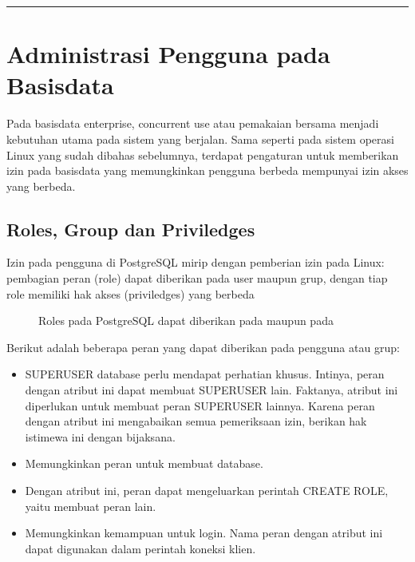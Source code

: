 \documentclass[letterpaper,10pt,english]{sphinxmanual}
\let\sphinxpxdimen\pdfpxdimen\else\newdimen\sphinxpxdimen
\begin{document}
\bigskip\hrule\bigskip



\section{Administrasi Pengguna pada Basisdata}
\label{\detokenize{sesi2/dbmanagement:administrasi-pengguna-pada-basisdata}}\label{\detokenize{sesi2/dbmanagement::doc}}
Pada basisdata enterprise, concurrent use atau pemakaian bersama menjadi kebutuhan utama pada sistem yang berjalan. Sama seperti pada sistem operasi Linux yang sudah dibahas sebelumnya, terdapat pengaturan untuk memberikan izin pada basisdata yang memungkinkan pengguna berbeda mempunyai izin akses yang berbeda.


\subsection{Roles, Group dan Priviledges}
\label{\detokenize{sesi2/dbmanagement:roles-group-dan-priviledges}}
Izin pada pengguna di PostgreSQL mirip dengan pemberian izin pada Linux: pembagian peran (role) dapat diberikan pada user maupun grup, dengan tiap role memiliki hak akses (priviledges) yang berbeda

\begin{figure}[htbp]
\centering
\capstart

\noindent\sphinxincludegraphics[height=400\sphinxpxdimen]{{2020-12-03-09-08-19}.png}
\caption{Roles pada PostgreSQL dapat diberikan pada  maupun pada }\label{\detokenize{sesi2/dbmanagement:pgroles}}\end{figure}

Berikut adalah beberapa peran yang dapat diberikan pada pengguna atau grup:
\begin{itemize}
\item {} 
 \sphinxhyphen{} SUPERUSER database perlu mendapat perhatian khusus. Intinya, peran dengan atribut ini dapat membuat SUPERUSER lain. Faktanya, atribut ini diperlukan untuk membuat peran SUPERUSER lainnya. Karena peran dengan atribut ini mengabaikan semua pemeriksaan izin, berikan hak istimewa ini dengan bijaksana.

\item {} 
 \sphinxhyphen{} Memungkinkan peran untuk membuat database.

\item {} 
 \sphinxhyphen{} Dengan atribut ini, peran dapat mengeluarkan perintah CREATE ROLE, yaitu membuat peran lain.

\item {} 
 \sphinxhyphen{} Memungkinkan kemampuan untuk login. Nama peran dengan atribut ini dapat digunakan dalam perintah koneksi klien.

\end{itemize}
\end{document}
